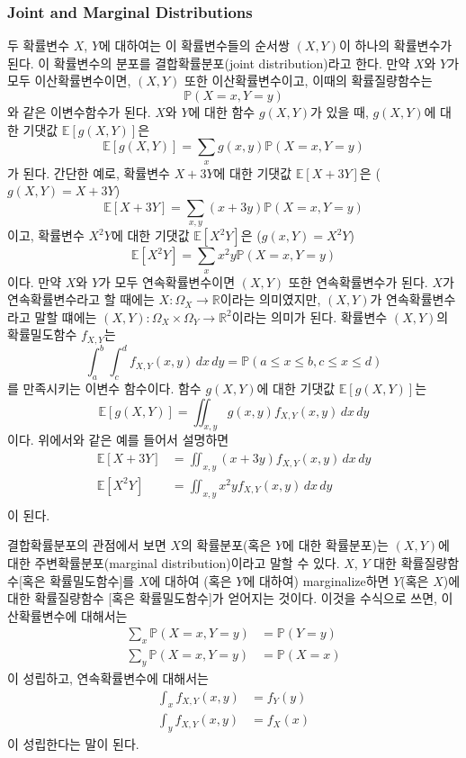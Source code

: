 \documentclass{article}
\begin{document}
%
\subsubsection{Joint and Marginal Distributions}
두 확률변수 \(X\), \(Y\)에 대하여는 이 확률변수들의 순서쌍 \((X,Y)\)이 하나의 확률변수가 된다.
이 확률변수의 분포를 결합확률분포(joint distribution)라고 한다.
만약 \(X\)와 \(Y\)가 모두 이산확률변수이면, \((X,Y)\) 또한 이산확률변수이고, 이때의 확률질량함수는
\[\mathbb P(X=x, Y=y)\]
와 같은 이변수함수가 된다.
\(X\)와 \(Y\)에 대한 함수 \(g(X,Y)\)가 있을 때, \(g(X,Y)\)에 대한 기댓값 \(\mathbb E[g(X,Y)]\)은
\[\mathbb E[g(X,Y)]=\sum_xg(x,y)\mathbb P(X=x,Y=y)\]
가 된다.
간단한 예로, 확률변수 \(X+3Y\)에 대한 기댓값 \(\mathbb E[X+3Y]\)은 (\(g(X,Y)=X+3Y\))
\[\mathbb E[X+3Y]=\sum_{x,y}(x+3y)\mathbb P(X=x,Y=y)\]
이고, 확률변수 \(X^2Y\)에 대한 기댓값 \(\mathbb E[X^2Y]\)은 (\(g(x,Y)=X^2Y\))
\[\mathbb E[X^2Y]=\sum_xx^2y\mathbb P(X=x,Y=y)\]
이다.
만약 \(X\)와 \(Y\)가 모두 연속확률변수이면 \((X,Y)\) 또한 연속확률변수가 된다.
\(X\)가 연속확률변수라고 할 때에는 \(X:\Omega_X\to\mathbb R\)이라는 의미였지만, \((X,Y)\)가 연속확률변수라고 말할 떄에는 \((X,Y):\Omega_X\times\Omega_Y\to\mathbb R^2\)이라는 의미가 된다.
확률변수 \((X,Y)\)의 확률밀도함수 \(f_{X,Y}\)는
\[\int_a^b\int_c^df_{X,Y}(x,y)\,dx\,dy=\mathbb P(a\le x\le b,c\le x\le d)\]
를 만족시키는 이변수 함수이다.
함수 \(g(X,Y)\)에 대한 기댓값 \(\mathbb E[g(X,Y)]\)는
\[\mathbb E[g(X,Y)]=\iint_{x,y}g(x,y)f_{X,Y}(x,y)\,dx\,dy\]
이다.
위에서와 같은 예를 들어서 설명하면
\begin{align*}
\mathbb E[X+3Y]&=\iint_{x,y}(x+3y)f_{X,Y}(x,y)\,dx\,dy\\
\mathbb E[X^2Y]&=\iint_{x,y}x^2yf_{X,Y}(x,y)\,dx\,dy\\
\end{align*}
이 된다.

결합확률분포의 관점에서 보면 \(X\)의 확률분포(혹은 \(Y\)에 대한 확률분포)는 \((X,Y)\)에 대한 주변확률분포(marginal distribution)이라고 말할 수 있다.
\(X\), \(Y\) 대한 확률질량함수[혹은 확률밀도함수]를 \(X\)에 대하여 (혹은 \(Y\)에 대하여) marginalize하면 \(Y\)(혹은 \(X\))에 대한 확률질량함수 [혹은 확률밀도함수]가 얻어지는 것이다.
이것을 수식으로 쓰면, 이산확률변수에 대해서는
\begin{align*}
\sum_x\mathbb P(X=x,Y=y)&=\mathbb P(Y=y)\\
\sum_y\mathbb P(X=x,Y=y)&=\mathbb P(X=x)
\end{align*}
이 성립하고, 연속확률변수에 대해서는
\begin{align*}
\int_xf_{X,Y}(x,y)&=f_Y(y)\\
\int_yf_{X,Y}(x,y)&=f_X(x)
\end{align*}
이 성립한다는 말이 된다.
\end{document}
